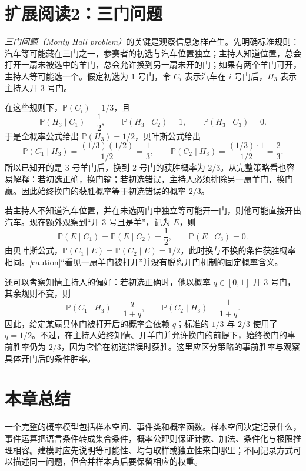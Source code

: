 \section{扩展阅读2：三门问题}
\label{sec:study-monty-hall}

\emph{三门问题（Monty Hall problem）}的关键是观察信息怎样产生。先明确标准规则：汽车等可能藏在三门之一，参赛者的初选与汽车位置独立；主持人知道位置，总会打开一扇未被选中的羊门，总会允许换到另一扇未开的门；如果有两个羊门可开，主持人等可能选一个。假定初选为 $1$ 号门，令 $C_i$ 表示汽车在 $i$ 号门后，$H_3$ 表示主持人开 $3$ 号门。

在这些规则下，$\mathbb P(C_i)=1/3$，且
\[
 \mathbb P(H_3\mid C_1)=\frac12,\qquad
 \mathbb P(H_3\mid C_2)=1,\qquad
 \mathbb P(H_3\mid C_3)=0.
\]
于是全概率公式给出 $\mathbb P(H_3)=1/2$，贝叶斯公式给出
\begin{equation}
 \mathbb P(C_1\mid H_3)=\frac{(1/3)(1/2)}{1/2}=\frac13,
 \qquad
 \mathbb P(C_2\mid H_3)=\frac{(1/3)\cdot1}{1/2}=\frac23.
 \label{eq:study-monty-hall-standard}
\end{equation}
所以已知开的是 $3$ 号羊门后，换到 $2$ 号门的获胜概率为 $2/3$。从完整策略看也容易解释：若初选正确，换门输；若初选错误，主持人必须排除另一扇羊门，换门赢。因此始终换门的获胜概率等于初选错误的概率 $2/3$。

若主持人不知道汽车位置，并在未选两门中独立等可能开一门，则他可能直接开出汽车。现在额外观察到“开 $3$ 号且是羊”，记为 $E$，则
\[
 \mathbb P(E\mid C_1)=\mathbb P(E\mid C_2)=\frac12,
 \qquad\mathbb P(E\mid C_3)=0.
\]
由贝叶斯公式，$\mathbb P(C_1\mid E)=\mathbb P(C_2\mid E)=1/2$，此时换与不换的条件获胜概率相同。\emph[caution]{“看见一扇羊门被打开”并没有脱离开门机制的固定概率含义。}

还可以考察知情主持人的偏好：若初选正确时，他以概率 $q\in[0,1]$ 开 $3$ 号门，其余规则不变，则
\[
 \mathbb P(C_1\mid H_3)=\frac{q}{1+q},\qquad
 \mathbb P(C_2\mid H_3)=\frac1{1+q}.
\]
因此，给定某扇具体门被打开后的概率会依赖 $q$；标准的 $1/3$ 与 $2/3$ 使用了 $q=1/2$。不过，在主持人始终知情、开羊门并允许换门的前提下，始终换门的事前胜率仍为 $2/3$，因为它恰在初选错误时获胜。这里应区分策略的事前胜率与观察具体开门后的条件胜率。

\section*{本章总结}

一个完整的概率模型包括样本空间、事件类和概率函数。样本空间决定记录什么，事件运算把语言条件转成集合条件，概率公理则保证计数、加法、条件化与极限推理相容。建模时应先说明等可能性、均匀取样或独立性来自哪里；不同记录方式可以描述同一问题，但合并样本点后要保留相应的权重。


